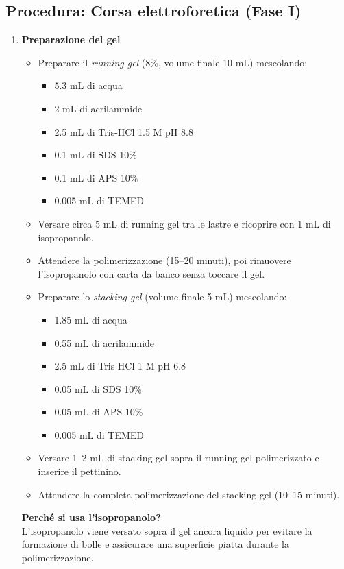 \subsection{Procedura: Corsa elettroforetica (Fase I)}
\begin{enumerate}
\item \textbf{Preparazione del gel}
  \begin{itemize}
    \item Preparare il \textit{running gel} (8\%, volume finale 10 mL) mescolando:
      \begin{itemize}
        \item 5.3 mL di acqua
        \item 2 mL di acrilammide
        \item 2.5 mL di Tris-HCl 1.5 M pH 8.8
        \item 0.1 mL di SDS 10\%
        \item 0.1 mL di APS 10\%
        \item 0.005 mL di TEMED
      \end{itemize}
    \item Versare circa 5 mL di running gel tra le lastre e ricoprire con 1 mL di isopropanolo.
    \item Attendere la polimerizzazione (15–20 minuti), poi rimuovere l’isopropanolo con carta da banco senza toccare il gel.
    \item Preparare lo \textit{stacking gel} (volume finale 5 mL) mescolando:
      \begin{itemize}
        \item 1.85 mL di acqua
        \item 0.55 mL di acrilammide
        \item 2.5 mL di Tris-HCl 1 M pH 6.8
        \item 0.05 mL di SDS 10\%
        \item 0.05 mL di APS 10\%
        \item 0.005 mL di TEMED
      \end{itemize}
    \item Versare 1–2 mL di stacking gel sopra il running gel polimerizzato e inserire il pettinino.
    \item Attendere la completa polimerizzazione del stacking gel (10–15 minuti).
  \end{itemize}

      \begin{percheBox}
        \textbf{Perché si usa l’isopropanolo?} \\
        L’isopropanolo viene versato sopra il gel ancora liquido per evitare la formazione di bolle e assicurare una superficie piatta durante la polimerizzazione.
    \end{percheBox}


\end{enumerate}
